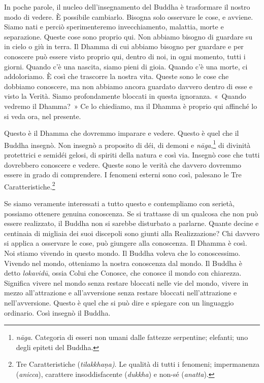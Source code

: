 In poche parole, il nucleo dell'insegnamento del Buddha è trasformare il
nostro modo di vedere. È possibile cambiarlo. Bisogna solo osservare le
cose, e avviene. Siamo nati e perciò sperimenteremo invecchiamento,
malattia, morte e separazione. Queste cose sono proprio qui. Non abbiamo
bisogno di guardare su in cielo o giù in terra. Il Dhamma di cui abbiamo
bisogno per guardare e per conoscere può essere visto proprio qui,
dentro di noi, in ogni momento, tutti i giorni. Quando c'è una nascita,
siamo pieni di gioia. Quando c'è una morte, ci addoloriamo. È così che
trascorre la nostra vita. Queste sono le cose che dobbiamo conoscere, ma
non abbiamo ancora guardato davvero dentro di esse e visto la Verità.
Siamo profondamente bloccati in questa ignoranza. «~Quando vedremo il
Dhamma?~» Ce lo chiediamo, ma il Dhamma è proprio qui affinché lo si
veda ora, nel presente.

Questo è il Dhamma che dovremmo imparare e vedere. Questo è quel che il
Buddha insegnò. Non insegnò a proposito di déi, di demoni e
\emph{nāga},\footnote{\emph{nāga}. Categoria di esseri non umani dalle
  fattezze serpentine; elefanti; uno degli epiteti del Buddha.} di
divinità protettrici e semidéi gelosi, di spiriti della natura e così
via. Insegnò cose che tutti dovrebbero conoscere e vedere. Queste sono
le verità che davvero dovremmo essere in grado di comprendere. I
fenomeni esterni sono così, palesano le Tre Caratteristiche.\footnote{Tre
  Caratteristiche (\emph{tilakkhaṇa)}. Le qualità di tutti i fenomeni;
  impermanenza (\emph{anicca}), carattere insoddisfacente
  (\emph{dukkha}) e non-sé (\emph{anatta}).}

Se siamo veramente interessati a tutto questo e contempliamo con
serietà, possiamo ottenere genuina conoscenza. Se si trattasse di un
qualcosa che non può essere realizzato, il Buddha non si sarebbe
disturbato a parlarne. Quante decine e centinaia di migliaia dei suoi
discepoli sono giunti alla Realizzazione? Chi davvero si applica a
osservare le cose, può giungere alla conoscenza. Il Dhamma è così. Noi
stiamo vivendo in questo mondo. Il Buddha voleva che lo conoscessimo.
Vivendo nel mondo, otteniamo la nostra conoscenza dal mondo. Il Buddha è
detto \emph{lokavidū}, ossia Colui che Conosce, che conosce il mondo con
chiarezza. Significa vivere nel mondo senza restare bloccati nelle vie
del mondo, vivere in mezzo all'attrazione e all'avversione senza restare
bloccati nell'attrazione e nell'avversione. Questo è quel che si può
dire e spiegare con un linguaggio ordinario. Così insegnò il Buddha.

